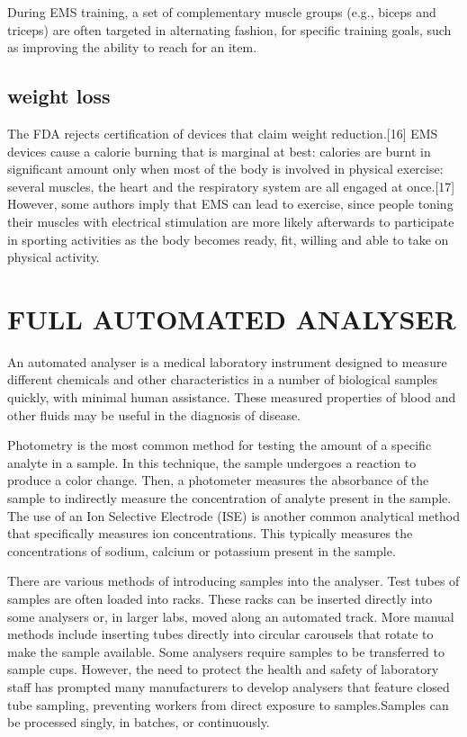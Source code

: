 \documentclass[12pt]{article}
\begin{document}
During EMS training, a set of complementary muscle groups (e.g., biceps and triceps) are often targeted in alternating fashion, for specific training goals, such as improving the ability to reach for an item.




\subsection{weight loss}



The FDA rejects certification of devices that claim weight reduction.[16] EMS devices cause a calorie burning that is marginal at best: calories are burnt in significant amount only when most of the body is involved in physical exercise: several muscles, the heart and the respiratory system are all engaged at once.[17] However, some authors imply that EMS can lead to exercise, since people toning their muscles with electrical stimulation are more likely afterwards to participate in sporting activities as the body becomes ready, fit, willing and able to take on physical activity.
\clearpage

\section{FULL AUTOMATED ANALYSER}

An automated analyser is a medical laboratory instrument designed to measure different chemicals and other characteristics in a number of biological samples quickly, with minimal human assistance. These measured properties of blood and other fluids may be useful in the diagnosis of disease.

Photometry is the most common method for testing the amount of a specific analyte in a sample. In this technique, the sample undergoes a reaction to produce a color change. Then, a photometer measures the absorbance of the sample to indirectly measure the concentration of analyte present in the sample. The use of an Ion Selective Electrode (ISE) is another common analytical method that specifically measures ion concentrations. This typically measures the concentrations of sodium, calcium or potassium present in the sample.

There are various methods of introducing samples into the analyser. Test tubes of samples are often loaded into racks. These racks can be inserted directly into some analysers or, in larger labs, moved along an automated track. More manual methods include inserting tubes directly into circular carousels that rotate to make the sample available. Some analysers require samples to be transferred to sample cups. However, the need to protect the health and safety of laboratory staff has prompted many manufacturers to develop analysers that feature closed tube sampling, preventing workers from direct exposure to samples.Samples can be processed singly, in batches, or continuously.
\end{document}
